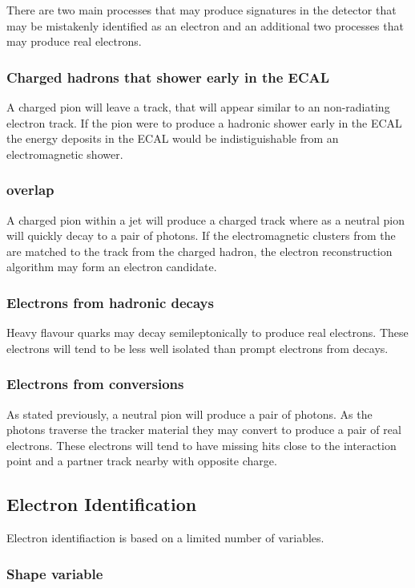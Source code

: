 There are two main processes that may produce signatures in the detector that
may be mistakenly identified as an electron and an additional
two processes that may produce real electrons.
\cite{Nikos}

\subsubsection{Charged hadrons that shower early in the ECAL}
A charged pion will leave a track, that will appear similar to an non-radiating
electron track. If the pion were to produce a hadronic shower early in the ECAL
the energy deposits in the ECAL would be indistiguishable from an
electromagnetic shower.

\subsubsection{\HepProcess{\Ppipm \Ppizero} overlap}
A charged pion within a jet will produce a charged track where as a neutral pion
will quickly decay to a pair of photons. If the electromagnetic clusters from
the \Ppizero are matched to the track from the charged hadron, the electron
reconstruction algorithm may form an electron candidate.

\subsubsection{Electrons from hadronic decays}
Heavy flavour quarks may decay semileptonically to produce real electrons. These
electrons will tend to be less well isolated than prompt electrons from \PW
decays.

\subsubsection{Electrons from conversions}
As stated previously, a neutral pion will produce a pair of photons. As the
photons traverse the tracker material they may convert to produce a pair of real
electrons. These electrons will tend to have missing hits close to the
interaction point and a partner track nearby with opposite charge.

\subsection{Electron Identification}
Electron identifiaction is based on a limited number of variables.

\subsubsection{Shape variable}

